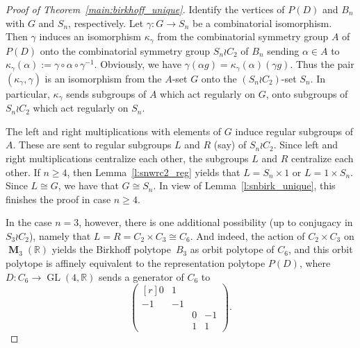 \documentclass[ALCO,Unicode]{cedram}
\renewcommand{\geq}{\geqslant}
\newcommand{\reals}{\mathbb{R}}
\newcommand{\iso}{\cong}    %
\DeclareMathOperator{\GL}{GL}
\DeclareMathOperator{\mat}{\mathbf{M}}      %
\begin{document}
\begin{proof}[Proof of Theorem~\ref{main:birkhoff_unique}]
    Identify the vertices of $P(D)$ and $B_n$
    with $G$ and $S_n$, respectively.
    Let 
    $\gamma\colon G\to S_n$ be a combinatorial isomorphism.
    Then $\gamma$ induces an isomorphism $\kappa_{\gamma}$
    from the combinatorial symmetry group
    $A$ of $P(D)$ onto the combinatorial symmetry group
    $S_n\wr C_2$ of $B_n$ sending 
    $\alpha\in A$ to 
    $\kappa_{\gamma}(\alpha):=\gamma \circ \alpha \circ \gamma^{-1}$.
    Obviously,
    we have $\gamma(\alpha g) = \kappa_{\gamma}(\alpha)(\gamma g)$.
    Thus the pair
    $(\kappa_{\gamma}, \gamma)$ is an isomorphism
    from the $A$-set $G$ onto the 
    $(S_n\wr C_2)$-set $S_n$.    
    In particular, $\kappa_{\gamma}$ sends subgroups
    of $A$ which act regularly on $G$, onto subgroups
    of $S_n \wr C_2$ which act regularly on $S_n$.

    The left and right multiplications with elements of $G$
    induce regular subgroups of $A$.
    These are sent to regular subgroups
    $L$ and $R$ (say) of $S_n \wr C_2$.
    Since left and right multiplications centralize each other,
    the subgroups $L$ and $R$ centralize each other.
    If $n\geq 4$, then Lemma~\ref{l:snwrc2_reg} yields
    that $L= S_n \times 1$ or $L=1\times S_n$. 
    Since $L\iso G$, we have that $G\iso S_n$.
    In view of Lemma~\ref{l:snbirk_unique},
    this finishes the proof in case $n\geq 4$.
    
    In the case $n=3$, however, there is one additional
    possibility (up to conjugacy in $S_3 \wr C_2$),
    namely that 
    $L= R = C_2 \times C_3\iso C_6$.
    And indeed, the action of
    $C_2\times C_3$ on $\mat_3(\reals)$ yields the 
    Birkhoff polytope~$B_3$ as orbit polytope of $C_6$,    
    and this orbit polytope is affinely equivalent 
    to the representation polytope $P(D)$,
    where $D\colon C_6 \to \GL(4,\reals)$
    sends a generator of $C_6$ to
    \[ \begin{pmatrix*}[r]
         0 & 1 & & \\
        -1 & -1 & & \\
           &    & 0 & -1 \\
           &    & 1 & 1 
       \end{pmatrix*}.
    \]
\end{proof}  



 

\end{document}
